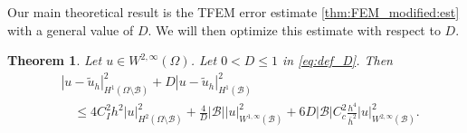 \documentclass{article}
\newtheorem{theorem}[lemma]{Theorem}
\theoremstyle{remark}
\def\B{\mathcal{B}}
\def\WIi{W^{1,\infty}}
\def\WIIi{W^{2,\infty}}
\def\tu{\tilde{u}}
\def\width{\bar{h}}
\begin{document}
Our main theoretical result is the TFEM error estimate \eqref{thm:FEM_modified:est} with a general value of $D$. We will then optimize this estimate with respect to $D$. 
\begin{theorem}
    \label{thm:FEM_modified}
    Let $u\in \WIIi(\Omega)$. Let $0<D\leq 1$ in \eqref{eq:def_D}. Then
    \begin{equation}
    \begin{split}
    \label{thm:FEM_modified:est}
    &|u-\tu_h|^2_{H^1(\Omega\setminus\B)} +D|u-\tu_h|^2_{H^1(\B)}\\
    &\quad\leq 4C_I^2h^2|u|^2_{H^2(\Omega\setminus\B)} + \frac{4}{D}|\B| |u|_{\WIi(\B)}^2 +6D|\B|C_c^2 \frac{h^4}{\width^2} |u|^2_{\WIIi(\B)}.
    \end{split}
    \end{equation}
    \end{theorem}
\end{document}
